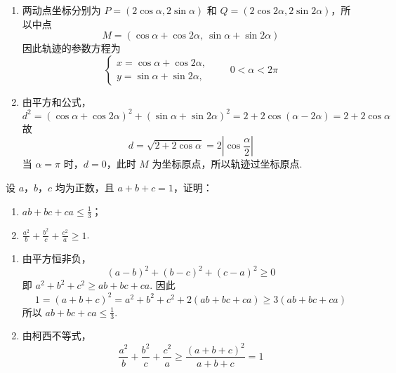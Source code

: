 \begin{solution}
\begin{enumerate}
\item 两动点坐标分别为 \(P=(2\cos\alpha,2\sin\alpha)\) 和 \(Q=(2\cos2\alpha,2\sin2\alpha)\)，所以中点
\[
M=\left(\cos\alpha+\cos2\alpha,\ \sin\alpha+\sin2\alpha\right)
\]
因此轨迹的参数方程为
\[
\begin{cases}
x=\cos\alpha+\cos2\alpha,\\
y=\sin\alpha+\sin2\alpha,
\end{cases}
\qquad 0<\alpha<2\pi
\]

\item 由平方和公式，
\[
d^2=(\cos\alpha+\cos2\alpha)^2+(\sin\alpha+\sin2\alpha)^2
=2+2\cos(\alpha-2\alpha)=2+2\cos\alpha
\]
故
\[
d=\sqrt{2+2\cos\alpha}=2\left|\cos\frac\alpha2\right|
\]
当 \(\alpha=\pi\) 时，\(d=0\)，此时 \(M\) 为坐标原点，所以轨迹过坐标原点.
\end{enumerate}
\end{solution}

\begin{problem}
设 \(a\)，\(b\)，\(c\) 均为正数，且 \(a + b + c = 1\)，证明：

\begin{enumerate}
\item \(ab + bc + ca \leqslant \frac{1}{3}\)；
\item \(\frac{a^2}{b} + \frac{b^2}{c} + \frac{c^2}{a} \geqslant 1\).
\end{enumerate}
\end{problem}

\begin{solution}
\begin{enumerate}
\item 由平方恒非负，
\[
(a-b)^2+(b-c)^2+(c-a)^2\geqslant0
\]
即 \(a^2+b^2+c^2\geqslant ab+bc+ca\). 因此
\[
1=(a+b+c)^2=a^2+b^2+c^2+2(ab+bc+ca)
\geqslant3(ab+bc+ca)
\]
所以 \(ab+bc+ca\leqslant\frac{1}{3}\).

\item 由柯西不等式，
\[
\frac{a^2}{b}+\frac{b^2}{c}+\frac{c^2}{a}
\geqslant\frac{(a+b+c)^2}{a+b+c}=1
\]
\end{enumerate}
\end{solution}
